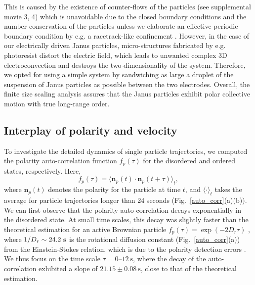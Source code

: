 \documentclass[%
 reprint,
 amsmath,amssymb,
 aps,
 floatfix
]{revtex4-2}
\newcommand{\pauto}{\langle\bm{n}_p(t)\cdot\bm{n}_p(t+\tau)\rangle_t}
\begin{document}
This is caused by the existence of counter-flows of the particles (see supplemental movie 3, 4) which is unavoidable due to the closed boundary conditions and the number conservation of the particles unless we elaborate an effective periodic boundary condition by e.g. a racetrack-like confinement \cite{bricard2013}. However, in the case of our electrically driven Janus particles, micro-structures fabricated by e.g. photoresist distort the electric field, which leads to unwanted complex 3D electroconvection and destroys the two-dimensionality of the system. Therefore, we opted for using a simple system by sandwiching as large a droplet of the suspension of Janus particles as possible between the two electrodes.
Overall, the finite size scaling analysis assures that the Janus particles exhibit polar collective motion with true long-range order.


\subsection{Interplay of polarity and velocity}
To investigate the detailed dynamics of single particle trajectories, we computed the polarity auto-correlation function $f_p(\tau)$ for the disordered and ordered states, respectively. 
Here, 
\begin{equation}
    f_p(\tau) = \pauto,
\end{equation}
where $\bm{n}_p(t)$ denotes the polarity for the particle at time $t$, and $\langle\cdot\rangle_t$ takes the average for particle trajectories longer than 24 seconds (Fig.~\ref{auto_corr}(a)(b)).
We can first observe that the polarity auto-correlation decays exponentially in the disordered state.
At small time scales, this decay was slightly faster than the theoretical estimation for an active Brownian particle $f_p(\tau) = \exp{(-2D_r\tau)}$ \cite{jiang2010}, where $1/D_r\sim24.2~{\rm s}$ is the rotational diffusion constant (Fig.~\ref{auto_corr}(a)) from the Einstein-Stokes relation, which is due to the polarity detection errors \cite{poncet2020}.
We thus focus on the time scale $\tau = \text{0--12}~\textrm{s}$, where the decay of the auto-correlation exhibited a slope of $21.15\pm 0.08~\textrm{s}$, close to that of the theoretical estimation.
\end{document}
